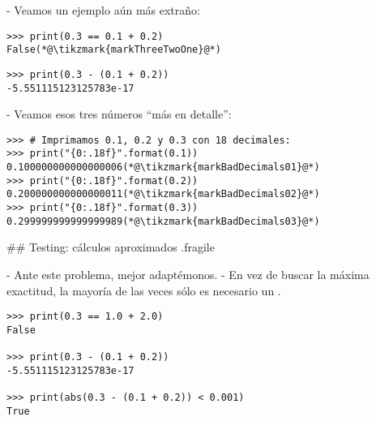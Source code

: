 
- Veamos un ejemplo aún más extraño:

\begin{lstlisting}
>>> print(0.3 == 0.1 + 0.2)
False(*@\tikzmark{markThreeTwoOne}@*)
\end{lstlisting}

\vspace{-2ex}

\pause

\begin{lstlisting}
>>> print(0.3 - (0.1 + 0.2))
-5.551115123125783e-17
\end{lstlisting}

- Veamos esos tres números ``más en detalle'':

\begin{lstlisting}
>>> # Imprimamos 0.1, 0.2 y 0.3 con 18 decimales:
>>> print("{0:.18f}".format(0.1))
0.100000000000000006(*@\tikzmark{markBadDecimals01}@*)
>>> print("{0:.18f}".format(0.2))
0.200000000000000011(*@\tikzmark{markBadDecimals02}@*)
>>> print("{0:.18f}".format(0.3))
0.299999999999999989(*@\tikzmark{markBadDecimals03}@*)
\end{lstlisting}



## Testing: cálculos aproximados {.fragile}


- Ante este problema, mejor adaptémonos.
- En vez de buscar la máxima exactitud, la mayoría de las veces sólo es necesario un .

\begin{lstlisting}
>>> print(0.3 == 1.0 + 2.0)
False

>>> print(0.3 - (0.1 + 0.2))
-5.551115123125783e-17

>>> print(abs(0.3 - (0.1 + 0.2)) < 0.001)
True
\end{lstlisting}

